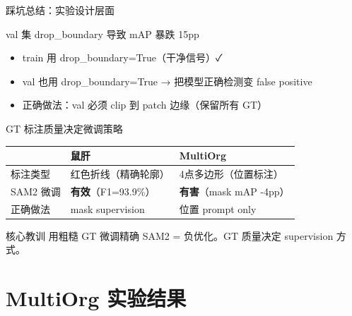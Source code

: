 \documentclass[aspectratio=169, 10pt]{beamer}
\begin{document}
\begin{frame}{踩坑总结：实验设计层面}
  \begin{block}{val 集 drop\_boundary 导致 mAP 暴跌 15pp}
    \begin{itemize}
      \item train 用 drop\_boundary=True（干净信号）✓
      \item val 也用 drop\_boundary=True → \alert{把模型正确检测变 false positive}
      \item 正确做法：val 必须 clip 到 patch 边缘（保留所有 GT）
    \end{itemize}
  \end{block}
  \vspace{0em}
  \begin{block}{GT 标注质量决定微调策略}
    \begin{tabular}{p{2.5cm}p{4cm}p{4cm}}
      \toprule
      & \textbf{鼠肝} & \textbf{MultiOrg} \\
      \midrule
      标注类型 & 红色折线（精确轮廓） & 4点多边形（位置标注） \\
      SAM2 微调 & \textbf{有效}（F1=93.9\%） & \textbf{有害}（mask mAP -4pp） \\
      正确做法 & mask supervision & 位置 prompt only \\
      \bottomrule
    \end{tabular}
  \end{block}
  \vspace{0em}
  \begin{alertblock}{核心教训}
    用粗糙 GT 微调精确 SAM2 = 负优化。GT 质量决定 supervision 方式。
  \end{alertblock}
\end{frame}

\section{MultiOrg 实验结果}
\end{document}
